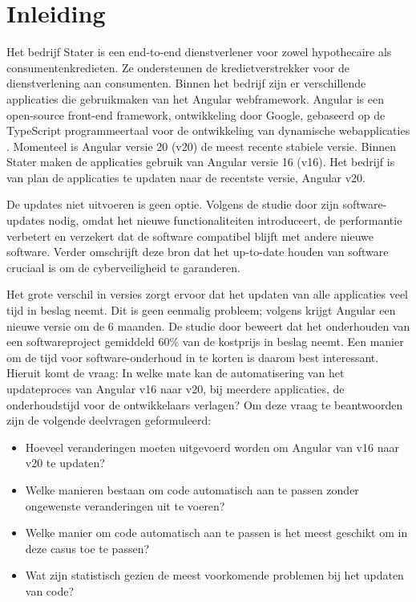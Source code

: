 
\section{Inleiding}
\label{sec:inleiding}

Het bedrijf Stater is een end-to-end dienstverlener voor zowel hypothecaire als consumentenkredieten.
Ze ondersteunen de kredietverstrekker voor de dienstverlening aan consumenten.
Binnen het bedrijf zijn er verschillende applicaties die gebruikmaken van het Angular webframework.
Angular is een open-source front-end framework, ontwikkeling door Google, gebaseerd op de TypeScript programmeertaal voor de ontwikkeling van dynamische webapplicaties \autocite{Cincovic2019}.
Momenteel is Angular versie 20 (v20) de meest recente stabiele versie.
Binnen Stater maken de applicaties gebruik van Angular versie 16 (v16).
Het bedrijf is van plan de applicaties te updaten naar de recentste versie, Angular v20.

De updates niet uitvoeren is geen optie.
Volgens de studie door \textcite{Vaniea2016} zijn software-updates nodig, omdat het nieuwe functionaliteiten introduceert, de performantie verbetert en verzekert dat de software compatibel blijft met andere nieuwe software.
Verder omschrijft deze bron dat het up-to-date houden van software cruciaal is om de cyberveiligheid te garanderen.

Het grote verschil in versies zorgt ervoor dat het updaten van alle applicaties veel tijd in beslag neemt.
Dit is geen eenmalig probleem; volgens \textcite{Callaghan2023} krijgt Angular een nieuwe versie om de 6 maanden.
De studie door \textcite{Kaur2015} beweert dat het onderhouden van een softwareproject gemiddeld 60\% van de kostprijs in beslag neemt.
Een manier om de tijd voor software-onderhoud in te korten is daarom best interessant.
Hieruit komt de vraag: In welke mate kan de automatisering van het updateproces van Angular v16 naar v20, bij meerdere applicaties, de onderhoudstijd voor de ontwikkelaars verlagen?
Om deze vraag te beantwoorden zijn de volgende deelvragen geformuleerd:
\begin{itemize}
  \item Hoeveel veranderingen moeten uitgevoerd worden om Angular van v16 naar v20 te updaten? 
  \item Welke manieren bestaan om code automatisch aan te passen zonder ongewenste veranderingen uit te voeren? 
  \item Welke manier om code automatisch aan te passen is het meest geschikt om in deze casus toe te passen?
  \item Wat zijn statistisch gezien de meest voorkomende problemen bij het updaten van code? 
\end{itemize}

